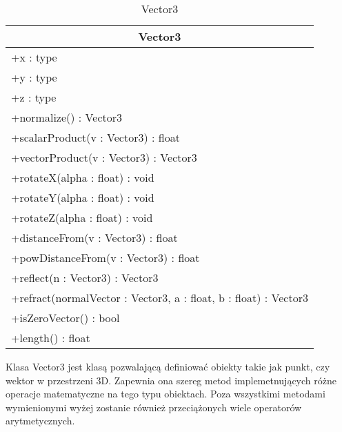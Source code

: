 \begin{longtable}{|p{16cm}|}
    \caption{Vector3} \label{tab:Vector3} \\ \hline
    \multicolumn{1}{|c|}{Vector3} \\ \hline
    +x : type \\
    +y : type \\
    +z : type \\
     \hline
	+normalize() : Vector3 \\ 
	+scalarProduct(v : Vector3) : float \\
	+vectorProduct(v : Vector3) : Vector3 \\
	+rotateX(alpha : float) : void \\
	+rotateY(alpha : float) : void \\
	+rotateZ(alpha : float) : void \\
	+distanceFrom(v : Vector3) : float \\
	+powDistanceFrom(v : Vector3) : float \\
	+reflect(n : Vector3) : Vector3 \\
	+refract(normalVector : Vector3, a : float, b : float) : Vector3 \\
	+isZeroVector() : bool \\
	+length() : float \\
	\hline
\end{longtable}

Klasa Vector3 jest klasą pozwalającą definiować obiekty takie jak punkt, czy wektor w przestrzeni 3D. Zapewnia ona szereg metod implemetnujących różne operacje matematyczne na tego typu obiektach. Poza wszystkimi metodami wymienionymi wyżej zostanie również przeciążonych wiele operatorów arytmetycznych.
